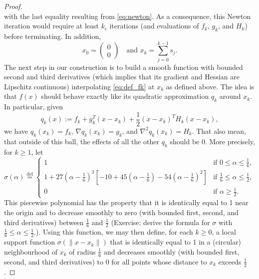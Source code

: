 \documentclass[10pt,a4paper]{article}
\begin{document}
\begin{proof}
\begin{equation*}
	\end{equation*}
	with the last equality resulting from \eqref{eq:newton}. As a consequence, this Newton iteration would require at least $k_\epsilon$ iterations (and evaluations of $f_k$, $g_k$, and $H_k$) before terminating. In addition,
	\begin{equation*}
		x_0 = \begin{pmatrix} 0 \\ 0 \end{pmatrix} \quad \text{and } x_k = \sum_{j=0}^{k-1} s_j. 
	\end{equation*}
	The next step in our construction is to build a smooth function with bounded second and third derivatives (which implies that its gradient and Hessian are Lipschitz continuous) interpolating \eqref{eq:def_fk} at $x_k$ as defined above. The idea is that $f(x)$ should behave exactly like its quadratic approximation $q_k$ around $x_k$. In particular, given 
	\begin{equation*}
		q_k(x) := f_k + g_k^T (x - x_k) + \frac{1}{2} (x - x_k)^T H_k (x - x_k),
	\end{equation*}
	we have $q_k(x_k) = f_k$, $\nabla q_k(x_k) = g_k$, and $\nabla^2 q_k(x_k) = H_k$. That also mean, that outside of this ball, the effects of all the other $q_k$ should be $0$. More precisely, for $k \geq 1$, let
	\begin{equation*}
		\sigma(\alpha) \stackrel{\text{def}}{=} \begin{cases}
			1 & \text{if } 0 \leq \alpha \leq \frac{1}{6}, \\
			1 + 27\left(\alpha - \frac{1}{6}\right)^3 \left[-10 + 45\left(\alpha - \frac{1}{6}\right) - 54\left(\alpha - \frac{1}{6}\right)^2\right] & \text{if } \frac{1}{6} \leq \alpha \leq \frac{1}{2}, \\
			0 & \text{if } \alpha \geq \frac{1}{2}.
		\end{cases}
	\end{equation*}
	This piecewise polynomial has the property that it is identically equal to 1 near the origin and to decrease smoothly to zero (with bounded first, second, and third derivatives) between $\frac{1}{6}$ and $\frac{1}{2}$ (Exercise: derive the formula for $\sigma$ with $\frac{1}{6}\leq \alpha\leq \frac{1}{2}$.). Using this function, we may then define, for each $k \geq 0$, a local support function $\sigma(\|x - x_k\|)$ that is identically equal to 1 in a (circular) neighbourhood of $x_k$ of radius $\frac{1}{6}$ and decreases smoothly (with bounded first, second, and third derivatives) to 0 for all points whose distance to $x_k$ exceeds $\frac{1}{2}$.

\end{proof}
\end{document}
